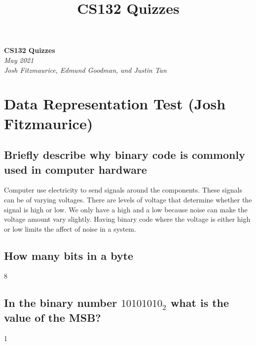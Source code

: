 \documentclass{article}
\title{CS132 Quizzes}
\begin{document}
\begin{center}
    \Huge\textbf{CS132 Quizzes}\\
    \huge\textit{May 2021}\\
    \medskip
    \Large\textit{Josh Fitzmaurice, Edmund Goodman, and Justin Tan}
\end{center}



\section{Data Representation Test (Josh Fitzmaurice)}
\subsection{Briefly describe why binary code is commonly used in computer hardware}
Computer use electricity to send signals around the components. These signals can be of varying voltages. There are levels of voltage that determine whether the signal is high or low. We only have a high and a low because noise can make the voltage amount vary slightly. Having binary code where the voltage is either high or low limits the affect of noise in a system.

\subsection{How many bits in a byte}
8

\subsection{In the binary number $10101010_2$ what is the value of the MSB?}
1
\newpage
\end{document}

